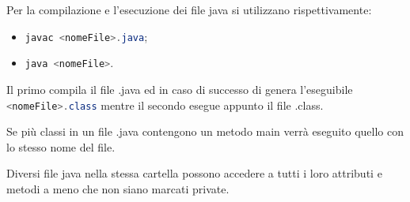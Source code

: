 \documentclass{subfile}
\begin{document}
Per la compilazione e l'esecuzione dei file java si utilizzano rispettivamente:
\begin{itemize}
    \item \lstinline[language = java]{javac <nomeFile>.java};
    \item \lstinline[language = java]{java <nomeFile>}.
\end{itemize}
Il primo compila il file .java ed in caso di successo di genera l'eseguibile \lstinline[language = java]{<nomeFile>.class}
mentre il secondo esegue appunto il file .class.

\begin{Note*}
    Se più classi in un file .java contengono un metodo main verrà eseguito quello con lo stesso nome del file.
\end{Note*}

\noindent Diversi file java nella stessa cartella possono accedere a tutti i loro attributi e metodi a meno che non siano marcati
private.
\end{document}

